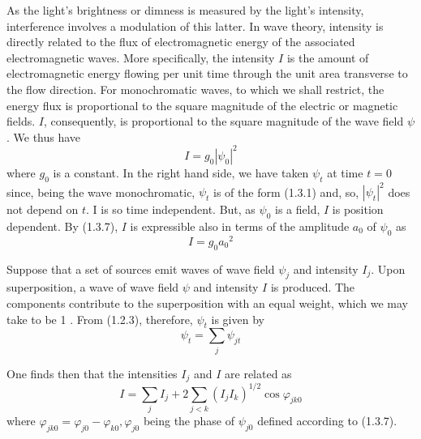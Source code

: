 \documentclass{article}
\begin{document}
As the light's brightness or dimness is measured by the light's intensity, interference involves a modulation of this latter. In wave theory, intensity is directly related to the flux of electromagnetic energy of the associated electromagnetic waves. More specifically, the intensity $I$ is the amount of electromagnetic energy flowing per unit time through the unit area transverse to the flow direction. For monochromatic waves, to which we shall restrict, the energy flux is proportional to the square magnitude of the electric or magnetic fields. $I$, consequently, is proportional to the square magnitude of the wave field $\psi$. We thus have
$$
\begin{equation*}
I=g_{0}\left|\psi_{0}\right|^{2} \tag{1.5.1}
\end{equation*}
$$
where $g_{0}$ is a constant. In the right hand side, we have taken $\psi_{t}$ at time $t=0$ since, being the wave monochromatic, $\psi_{t}$ is of the form (1.3.1) and, so, $\left|\psi_{t}\right|^{2}$ does not depend on $t$. I is so time independent. But, as $\psi_{0}$ is a field, $I$ is position dependent. By (1.3.7), $I$ is expressible also in terms of the amplitude $a_{0}$ of $\psi_{0}$ as
$$
\begin{equation*}
I=g_{0} a_{0}{ }^{2} \tag{1.5.2}
\end{equation*}
$$

Suppose that a set of sources emit waves of wave field $\psi_{j}$ and intensity $I_{j}$. Upon superposition, a wave of wave field $\psi$ and intensity $I$ is produced. The components contribute to the superposition with an equal weight, which we may take to be 1 . From (1.2.3), therefore, $\psi_{t}$ is given by
$$
\begin{equation*}
\psi_{t}=\sum_{j} \psi_{j t} \tag{1.5.3}
\end{equation*}
$$

One finds then that the intensities $I_{j}$ and $I$ are related as
$$
\begin{equation*}
I=\sum_{j} I_{j}+2 \sum_{j<k}\left(I_{j} I_{k}\right)^{1 / 2} \cos \varphi_{j k 0} \tag{1.5.4}
\end{equation*}
$$
where $\varphi_{j k 0}=\varphi_{j 0}-\varphi_{k 0}, \varphi_{j 0}$ being the phase of $\psi_{j 0}$ defined according to (1.3.7).
\end{document}

